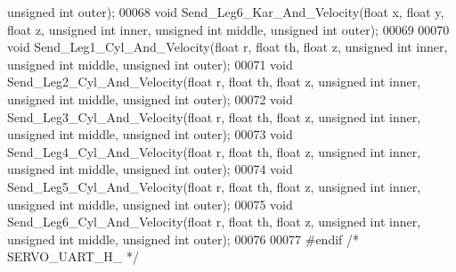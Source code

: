 \begin{DoxyCode}
{      unsigned} \textcolor{keywordtype}{int} outer);
00068 \textcolor{keywordtype}{void} Send\_Leg6\_Kar\_And\_Velocity(\textcolor{keywordtype}{float} x, \textcolor{keywordtype}{float} y, \textcolor{keywordtype}{float} z, \textcolor{keywordtype}{unsigned} \textcolor{keywordtype}{int} inner, \textcolor{keywordtype}{unsigned} \textcolor{keywordtype}{int} middle, \textcolor{keywordtype}{
      unsigned} \textcolor{keywordtype}{int} outer);
00069 
00070 \textcolor{keywordtype}{void} Send\_Leg1\_Cyl\_And\_Velocity(\textcolor{keywordtype}{float} r, \textcolor{keywordtype}{float} th, \textcolor{keywordtype}{float} z, \textcolor{keywordtype}{unsigned} \textcolor{keywordtype}{int} inner, \textcolor{keywordtype}{unsigned} \textcolor{keywordtype}{int} middle, \textcolor{keywordtype}{
      unsigned} \textcolor{keywordtype}{int} outer);
00071 \textcolor{keywordtype}{void} Send\_Leg2\_Cyl\_And\_Velocity(\textcolor{keywordtype}{float} r, \textcolor{keywordtype}{float} th, \textcolor{keywordtype}{float} z, \textcolor{keywordtype}{unsigned} \textcolor{keywordtype}{int} inner, \textcolor{keywordtype}{unsigned} \textcolor{keywordtype}{int} middle, \textcolor{keywordtype}{
      unsigned} \textcolor{keywordtype}{int} outer);
00072 \textcolor{keywordtype}{void} Send\_Leg3\_Cyl\_And\_Velocity(\textcolor{keywordtype}{float} r, \textcolor{keywordtype}{float} th, \textcolor{keywordtype}{float} z, \textcolor{keywordtype}{unsigned} \textcolor{keywordtype}{int} inner, \textcolor{keywordtype}{unsigned} \textcolor{keywordtype}{int} middle, \textcolor{keywordtype}{
      unsigned} \textcolor{keywordtype}{int} outer);
00073 \textcolor{keywordtype}{void} Send\_Leg4\_Cyl\_And\_Velocity(\textcolor{keywordtype}{float} r, \textcolor{keywordtype}{float} th, \textcolor{keywordtype}{float} z, \textcolor{keywordtype}{unsigned} \textcolor{keywordtype}{int} inner, \textcolor{keywordtype}{unsigned} \textcolor{keywordtype}{int} middle, \textcolor{keywordtype}{
      unsigned} \textcolor{keywordtype}{int} outer);
00074 \textcolor{keywordtype}{void} Send\_Leg5\_Cyl\_And\_Velocity(\textcolor{keywordtype}{float} r, \textcolor{keywordtype}{float} th, \textcolor{keywordtype}{float} z, \textcolor{keywordtype}{unsigned} \textcolor{keywordtype}{int} inner, \textcolor{keywordtype}{unsigned} \textcolor{keywordtype}{int} middle, \textcolor{keywordtype}{
      unsigned} \textcolor{keywordtype}{int} outer);
00075 \textcolor{keywordtype}{void} Send\_Leg6\_Cyl\_And\_Velocity(\textcolor{keywordtype}{float} r, \textcolor{keywordtype}{float} th, \textcolor{keywordtype}{float} z, \textcolor{keywordtype}{unsigned} \textcolor{keywordtype}{int} inner, \textcolor{keywordtype}{unsigned} \textcolor{keywordtype}{int} middle, \textcolor{keywordtype}{
      unsigned} \textcolor{keywordtype}{int} outer);
00076 
00077 \textcolor{preprocessor}{#endif }\textcolor{comment}{/* SERVO\_UART\_H\_ */}\textcolor{preprocessor}{}
\end{DoxyCode}
